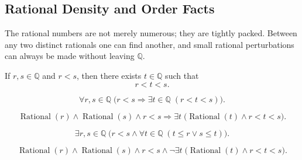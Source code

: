 
\subsection{Rational Density and Order Facts}
\label{sec:rational-density-and-order}

The rational numbers are not merely numerous; they are tightly packed.  Between
any two distinct rationals one can find another, and small rational
perturbations can always be made without leaving $\mathbb{Q}$.

\begin{tcolorbox}[colback=thmbox, colframe=thmborder, arc=2pt,
  left=6pt, right=6pt, top=4pt, bottom=4pt,
  title={\small\textbf{Theorem (Between Any Two Rational Numbers Lies Another Rational)}},
  fonttitle=\small\bfseries]
\begin{theorem}
\label{thm:between-any-two-rationals-is-a-rational}
If $r,s\in\mathbb{Q}$ and $r<s$, then there exists $t\in\mathbb{Q}$ such that
\[
r<t<s.
\]
\end{theorem}
\end{tcolorbox}

\begin{remark*}
\[
\forall r,s\in\mathbb{Q}\;
\bigl(r<s \Longrightarrow \exists t\in\mathbb{Q}\;(r<t<s)\bigr).
\]
\end{remark*}

\begin{remark*}
\[
\operatorname{Rational}(r)\land \operatorname{Rational}(s)\land r<s
\Longrightarrow
\exists t\;\bigl(\operatorname{Rational}(t)\land r<t<s\bigr).
\]
\end{remark*}

\begin{remark*}
\[
\exists r,s\in\mathbb{Q}\;
\bigl(r<s \land \forall t\in\mathbb{Q}\;(t\le r \lor s\le t)\bigr).
\]
\end{remark*}

\begin{remark*}
\[
\operatorname{Rational}(r)\land \operatorname{Rational}(s)\land r<s
\land
\neg\exists t\;\bigl(\operatorname{Rational}(t)\land r<t<s\bigr).
\]
\end{remark*}

